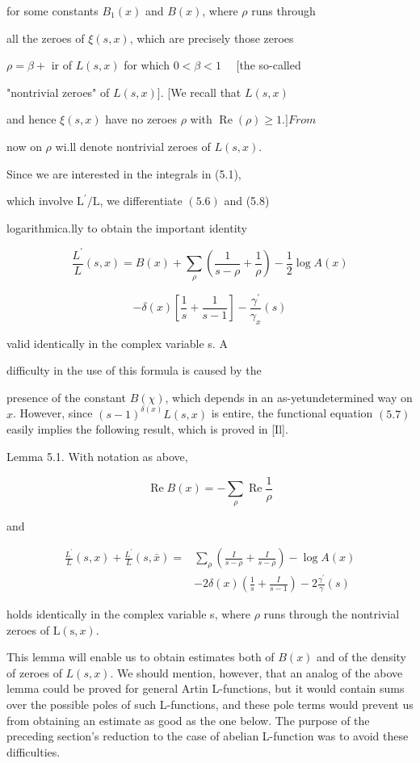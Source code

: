 for some constants $B_{1}(x)$ and $B(x)$, where $\rho$ runs through

all the zeroes of $\xi(s, x)$, which are precisely those zeroes

$\rho=\beta+$ ir of $L(s, x)$ for which $0<\beta<1 \quad$ [the so-called

"nontrivial zeroes" of $L(s, x)]$. [We recall that $L(s, x)$

and hence $\xi(s, x)$ have no zeroes $\rho$ with $\operatorname{Re}(\rho) \geqslant 1$.$] From$

now on $\rho$ wi.ll denote nontrivial zeroes of $L(s, x)$.

Since we are interested in the integrals in (5.1),

which involve $\mathrm{L}^{\prime} / \mathrm{L}$, we differentiate $(5.6)$ and (5.8)

logarithmica.lly to obtain the important identity

$$
\frac{L^{\prime}}{L}(s, x)=B(x)+\sum_{\rho}\left(\frac{1}{s-\rho}+\frac{1}{\rho}\right)-\frac{1}{2} \log A(x)
$$

$$
-\delta(x)\left[\frac{1}{s}+\frac{1}{s-1}\right]-\frac{\gamma^{\prime}}{\gamma_{x}}(s)
$$

valid identically in the complex variable s. A

difficulty in the use of this formula is caused by the

presence of the constant $B(\chi)$, which depends in an as-yetundetermined way on $x$. However, since $(s-1)^{\delta(x)} L(s, x)$ is entire, the functional equation $(5.7)$ easily implies the following result, which is proved in [Il].

Lemma 5.1. With notation as above,

$$
\operatorname{Re} B(x)=-\sum_{\rho} \operatorname{Re} \frac{1}{\rho}
$$

and

$$
\begin{aligned}
\frac{L^{\prime}}{L}(s, x)+\frac{L^{\prime}}{L}(s, \bar{x})=& \sum_{\rho}\left(\frac{I}{s-\rho}+\frac{I}{s-\rho}\right)-\log A(x) \\
&-2 \delta(x)\left(\frac{1}{s}+\frac{I}{s-1}\right)-2 \frac{\gamma^{\prime}}{\gamma}(s)
\end{aligned}
$$

holds identically in the complex variable s, where $\rho$ runs through the nontrivial zeroes of $\mathrm{L}(\mathrm{s}, x)$.

This lemma will enable us to obtain estimates both of $B(x)$ and of the density of zeroes of $L(s, x)$. We should mention, however, that an analog of the above lemma could be proved for general Artin L-functions, but it would contain sums over the possible poles of such L-functions, and these pole terms would prevent us from obtaining an estimate as good as the one below. The purpose of the preceding section's reduction to the case of abelian L-function was to avoid these difficulties.


